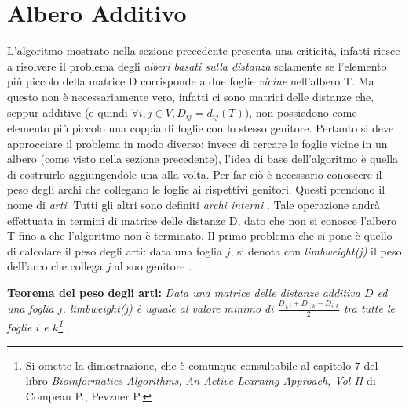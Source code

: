 \section{Albero Additivo}
L'algoritmo mostrato nella sezione precedente presenta una criticità, infatti riesce a risolvere il problema degli \textit{alberi basati sulla distanza} solamente se l'elemento più piccolo della matrice D corrisponde a due foglie \textit{vicine} nell'albero T. Ma questo non è necessariamente vero, infatti ci sono matrici delle distanze che, seppur additive (e quindi $ \forall i,j\in V,D_{ij}=d_{ij}(T)$), non possiedono come elemento più piccolo una coppia di foglie con lo stesso genitore. Pertanto si deve approcciare il problema in modo diverso: invece di cercare le foglie vicine in un albero (come visto nella sezione precedente), l'idea di base dell'algoritmo è quella di costruirlo aggiungendole una alla volta. Per far ciò è necessario conoscere il peso degli archi che collegano le foglie ai rispettivi genitori. Questi prendono il nome di \textit{arti}. Tutti gli altri sono definiti \textit{archi interni} \cite{cambridgeBioInf}. Tale operazione andrà effettuata in termini di matrice delle distanze D, dato che non si conosce l'albero T fino a che l'algoritmo non è terminato.
\newline
Il primo problema che si pone è quello di calcolare il peso degli arti: data una foglia $j$, si denota con \textit{limbweight(j)} il peso dell'arco che collega $j$ al suo genitore \cite{bioinfvideoAdditive}.

\begin{center}
\textbf{Teorema del peso degli arti:}
\newline
\textit{Data una matrice delle distanze additiva $D$ ed una foglia $j$, \textit{limbweight(j)} è uguale al valore minimo di $\frac{D_{j,i}+D_{j,k}-D_{i,k}}{2}$ tra tutte le foglie $i$ e $k$\footnote{Si omette la dimostrazione, che è comunque consultabile al capitolo 7 del libro \textit{Bioinformatics Algorithms, An Active Learning Approach, Vol II} di Compeau P., Pevzner P.} \cite{bioinfalganactivelearningapproachparttwo}} .
\end{center}

